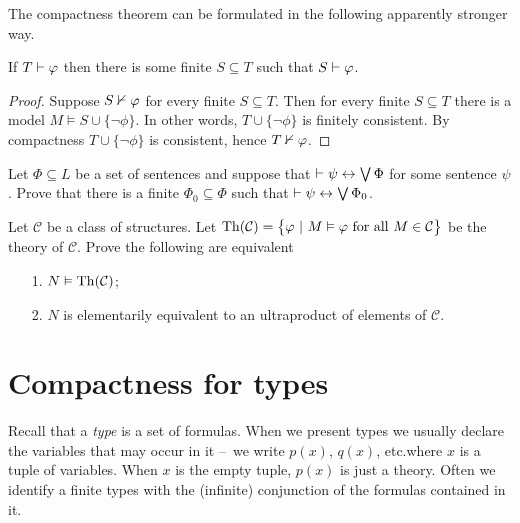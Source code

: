 The compactness theorem can be formulated in the following apparently stronger way.

\begin{corollary}\label{compattezza2}
If $T\vdash\varphi$ then there is some finite $S\subseteq T$ such that $S\vdash\varphi$.
\end{corollary}

\begin{proof}
Suppose $S\nvdash\varphi$ for every finite $S\subseteq T$. Then for every finite $S\subseteq T$ there is a model $M\models S\cup\{\neg\phi\}$. In other words, $T\cup\{\neg\phi\}$ is finitely consistent. By compactness $T\cup\{\neg\phi\}$ is consistent, hence $T\nvdash \varphi$.
\end{proof}

\begin{exercise}
Let $\Phi\subseteq L$ be a set of sentences and suppose that $\vdash\psi\leftrightarrow\bigvee\Phi$ for some sentence $\psi$. Prove that there is a finite $\Phi_0\subseteq\Phi$ such that  $\vdash\psi\leftrightarrow\bigvee\Phi_0$.
\end{exercise}

\begin{exercise}
Let ${\mathcal C}$ be a class of structures. 
Let ${\rm Th}({\mathcal C}) = \big\{\varphi\ |\ M\vDash \varphi\ \mathrm{for\ all}\ M \in {\mathcal C}\big\}$ be the theory of ${\mathcal C}$. 
Prove the following are equivalent
\begin{itemize}
\item[1.] $N\vDash{\rm Th}({\mathcal C})$; 
\item[2.] $N$ is elementarily equivalent to an ultraproduct of elements of ${\mathcal C}$.
\end{itemize}
\end{exercise}
\section{Compactness for types}

\def\ceq#1#2#3{\parbox{13ex}{$\displaystyle #1$}\parbox{4ex}{\hfil$#2$}$\displaystyle #3$}
 
Recall that a \emph{type\/} is a set of formulas. When we present types we usually declare the variables that may occur in it --~we write \emph{$p(x)$}, \emph{$q(x)$}, etc.\@ where $x$ is a tuple of variables.
When $x$ is the empty tuple, $p(x)$ is just a theory.
Often we identify a finite types with the (infinite) conjunction of the formulas contained in it.

